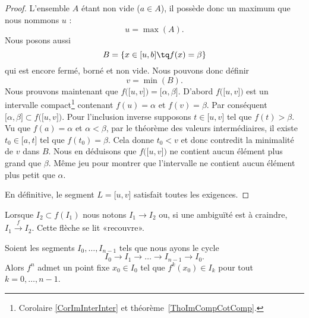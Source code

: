 \begin{proof}
	L'ensemble \( A\) étant non vide (\( a\in A\)), il possède donc un maximum que nous nommons \( u\) :
	\begin{equation}
		u=\max(A).
	\end{equation}
	Nous posons aussi
	\begin{equation}
		B=\{ x\in \mathopen[ u , b \mathclose]\tq f(x)=\beta \}
	\end{equation}
	qui est encore fermé, borné et non vide. Nous pouvons donc définir
	\begin{equation}
		v=\min(B).
	\end{equation}
	Nous prouvons maintenant que \( f\big( \mathopen[ u , v \mathclose] \big)=\mathopen[ \alpha , \beta \mathclose]\). D'abord \( f\big( \mathopen[ u , v \mathclose] \big)\) est un intervalle compact\footnote{Corolaire \ref{CorImInterInter} et théorème~\ref{ThoImCompCotComp}.} contenant \( f(u)=\alpha\) et \( f(v)=\beta\). Par conséquent \( \mathopen[ \alpha , \beta \mathclose]\subset f\big( \mathopen[ u , v \mathclose] \big)\). Pour l'inclusion inverse supposons \( t\in \mathopen[ u , v \mathclose]\) tel que \( f(t)>\beta\). Vu que \( f(a)=\alpha\) et \( \alpha<\beta\), par le théorème des valeurs intermédiaires, il existe \( t_0\in \mathopen[ a , t \mathclose]\) tel que \( f(t_0)=\beta\). Cela donne \( t_0<v\) et donc contredit la minimalité de \( v\) dans \( B\). Nous en déduisons que \( f\big( \mathopen[ u , v \mathclose] \big)\) ne contient aucun élément plus grand que \( \beta\). Même jeu pour montrer que l'intervalle ne contient aucun élément plus petit que \( \alpha\).

	En définitive, le segment \( L=\mathopen[ u , v \mathclose]\) satisfait toutes les exigences.
\end{proof}

Lorsque \( I_2\subset f(I_1)\) nous notons \( I_1\to I_2\) ou, si une ambiguïté est à craindre, \( I_1\stackrel{f}{\longrightarrow}I_2\). Cette flèche se lit «recouvre».
\begin{lemma}      \label{LemSSPXooMkwzjb}
	Soient les segments \( I_0,\ldots, I_{n-1}\) tels que nous ayons le cycle
	\begin{equation}
		I_0\to I_1\to\ldots\to I_{n-1}\to I_0.
	\end{equation}
	Alors \( f^n\) admet un point fixe \( x_0\in I_0\) tel que \( f^k(x_0)\in I_k\) pour tout \( k=0,\ldots, n-1\).
\end{lemma}

